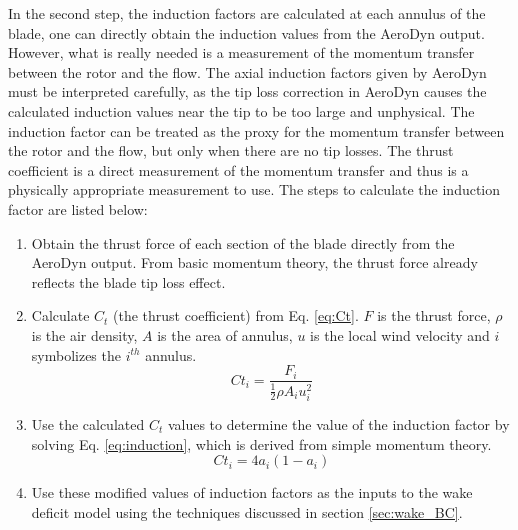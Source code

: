 \documentclass{umthesis}
\begin{document}
In the second step, the induction factors are calculated at each annulus of the blade, one can directly obtain the induction values from the AeroDyn output. However, what is really needed is a measurement of the momentum transfer between the rotor and the flow. The axial induction factors given by AeroDyn must be interpreted carefully, as the tip loss correction in AeroDyn causes the calculated induction values near the tip to be too large and unphysical. The induction factor can be treated as the proxy for the momentum transfer between the rotor and the flow, but only when there are no tip losses. The thrust coefficient is a direct measurement of the momentum transfer and thus is a physically appropriate measurement to use. The steps to calculate the induction factor are listed below:
\begin{enumerate}
  \item Obtain the thrust force of each section of the blade directly from the AeroDyn output. From basic momentum theory, the thrust force already reflects the blade tip loss effect.
  \item Calculate $C_t$ (the thrust coefficient) from Eq. \ref{eq:Ct}. $F$ is the thrust force, $\rho$ is the air density, $A$ is the area of annulus, $u$ is the local wind velocity and $i$ symbolizes the $i^{th}$ annulus.
      \begin{equation}\label{eq:Ct}
      Ct_i=\frac{F_i}{\frac{1}{2}\rho A_i u_i^2}
      \end{equation}
  \item Use the calculated $C_t$ values to determine the value of the induction factor by solving Eq. \ref{eq:induction}, which is derived from simple momentum theory.
      \begin{equation}\label{eq:induction}
      Ct_i=4a_i(1-a_i)
      \end{equation}
  \item Use these modified values of induction factors as the inputs to the wake deficit model using the techniques discussed in section \ref{sec:wake_BC}.
\end{enumerate}
\end{document}
